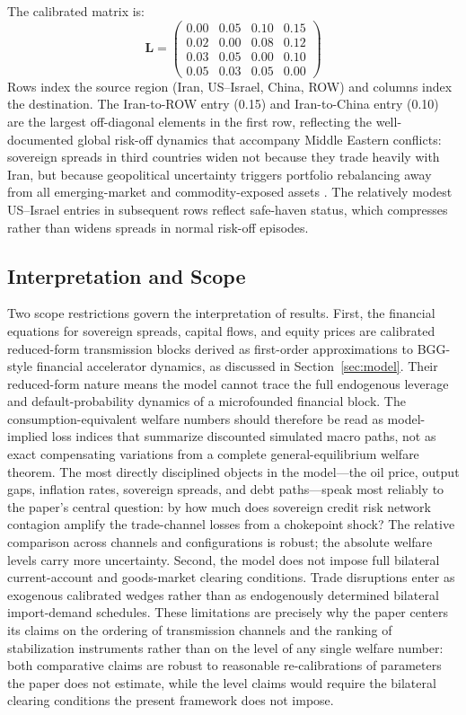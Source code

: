 \documentclass[12pt]{article}
\begin{document}
The calibrated matrix is:
\begin{equation}
\mathbf{L} = \begin{pmatrix}
0.00 & 0.05 & 0.10 & 0.15 \\
0.02 & 0.00 & 0.08 & 0.12 \\
0.03 & 0.05 & 0.00 & 0.10 \\
0.05 & 0.03 & 0.05 & 0.00
\end{pmatrix}
\label{eq:linkage_matrix}
\end{equation}
Rows index the source region (Iran, US--Israel, China, ROW) and columns index the destination. The Iran-to-ROW entry (0.15) and Iran-to-China entry (0.10) are the largest off-diagonal elements in the first row, reflecting the well-documented global risk-off dynamics that accompany Middle Eastern conflicts: sovereign spreads in third countries widen not because they trade heavily with Iran, but because geopolitical uncertainty triggers portfolio rebalancing away from all emerging-market and commodity-exposed assets \citep{caldara2022measuring}. The relatively modest US--Israel entries in subsequent rows reflect safe-haven status, which compresses rather than widens spreads in normal risk-off episodes.

\subsection{Interpretation and Scope}

Two scope restrictions govern the interpretation of results. First, the financial equations for sovereign spreads, capital flows, and equity prices are calibrated reduced-form transmission blocks derived as first-order approximations to BGG-style financial accelerator dynamics, as discussed in Section~\ref{sec:model}. Their reduced-form nature means the model cannot trace the full endogenous leverage and default-probability dynamics of a microfounded financial block. The consumption-equivalent welfare numbers should therefore be read as model-implied loss indices that summarize discounted simulated macro paths, not as exact compensating variations from a complete general-equilibrium welfare theorem. The most directly disciplined objects in the model---the oil price, output gaps, inflation rates, sovereign spreads, and debt paths---speak most reliably to the paper's central question: by how much does sovereign credit risk network contagion amplify the trade-channel losses from a chokepoint shock? The relative comparison across channels and configurations is robust; the absolute welfare levels carry more uncertainty. Second, the model does not impose full bilateral current-account and goods-market clearing conditions. Trade disruptions enter as exogenous calibrated wedges rather than as endogenously determined bilateral import-demand schedules. These limitations are precisely why the paper centers its claims on the ordering of transmission channels and the ranking of stabilization instruments rather than on the level of any single welfare number: both comparative claims are robust to reasonable re-calibrations of parameters the paper does not estimate, while the level claims would require the bilateral clearing conditions the present framework does not impose.
\end{document}
